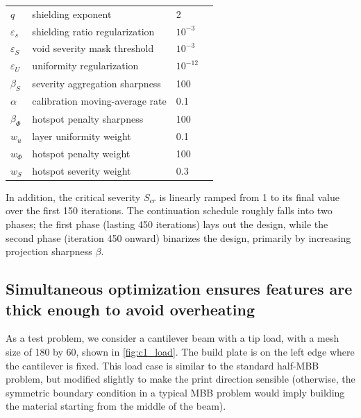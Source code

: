 \documentclass{article}
\begin{document}
\begin{table}[ht!]
\begin{tabular}{llll}
        $q$               & shielding exponent                   & 2                    &                           \\
        $\varepsilon_s$   & shielding ratio regularization       & $10^{-3}$            &                           \\
        $\varepsilon_S$   & void severity mask threshold         & $10^{-3}$            &                           \\
        $\varepsilon_U$   & uniformity regularization            & $10^{-12}$           &                           \\
        $\beta_S$         & severity aggregation sharpness       & 100                  &                           \\
        $\alpha$          & calibration moving-average rate      & 0.1                  &                           \\
        $\beta_\Phi$      & hotspot penalty sharpness            & 100                  &                           \\
        $w_u$             & layer uniformity weight              & 0.1                  &                           \\
        $w_\Phi$          & hotspot penalty weight               & 100                  &                           \\
        $w_S$             & hotspot severity weight              & 0.3                  &                           \\
        \bottomrule
    \end{tabular}
\end{table}

In addition, the critical severity $S_{cr}$ is linearly ramped from 1 to its final value over the first 150 iterations. The continuation schedule roughly falls into two phases; the first phase (lasting 450 iterations) lays out the design, while the second phase (iteration 450 onward) binarizes the design, primarily by increasing projection sharpness $\beta$.

\subsection{Simultaneous optimization ensures features are thick enough to avoid overheating}
\label{sec:sim_vs_seq}
As a test problem, we consider a cantilever beam with a tip load, with a mesh size of 180 by 60, shown in \autoref{fig:c1_load}. The build plate is on the left edge where the cantilever is fixed. This load case is similar to the standard half-MBB problem, but modified slightly to make the print direction sensible (otherwise, the symmetric boundary condition in a typical MBB problem would imply building the material starting from the middle of the beam).
\end{document}
